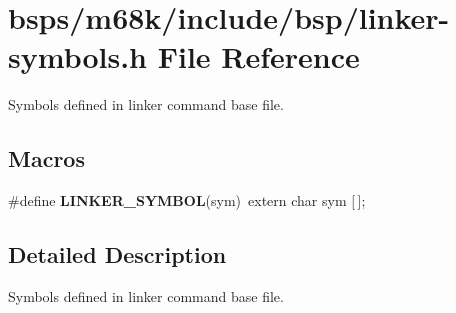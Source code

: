 \hypertarget{m68k_2include_2bsp_2linker-symbols_8h}{}\section{bsps/m68k/include/bsp/linker-\/symbols.h File Reference}
\label{m68k_2include_2bsp_2linker-symbols_8h}


Symbols defined in linker command base file.  


\subsection*{Macros}
\begin{DoxyCompactItemize}
\item 
\#define {\bfseries L\+I\+N\+K\+E\+R\+\_\+\+S\+Y\+M\+B\+OL}(sym)~extern char sym \mbox{[}$\,$\mbox{]};
\end{DoxyCompactItemize}


\subsection{Detailed Description}
Symbols defined in linker command base file. 

